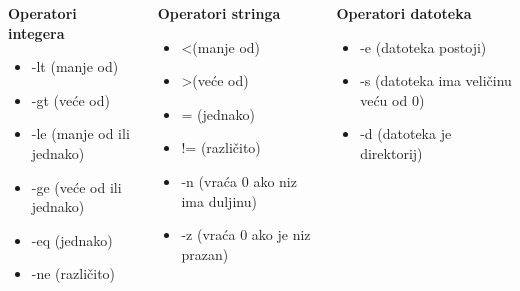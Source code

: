 \documentclass{beamer}
\begin{document}
\begin{frame}
	\begin{columns}[onlytextwidth]
		\begin{column}{0.33\textwidth}
			\centering
			\textbf{Operatori integera} \\
			\begin{itemize}
				\item -lt (manje od)
				\item -gt (veće od)
				\item -le (manje od ili jednako)
				\item -ge (veće od ili jednako)
				\item -eq (jednako)
				\item -ne (različito)
			\end{itemize}
		\end{column}
		\begin{column}{0.33\textwidth}
			\centering
			\textbf{Operatori stringa} \\
			\begin{itemize}
				\item \textless (manje od)
				\item \textgreater (veće od)
				\item = (jednako)
				\item != (različito)
				\item -n (vraća 0 ako niz ima duljinu)
				\item -z (vraća 0 ako je niz prazan)
			\end{itemize}
		\end{column}
		\begin{column}{0.33\textwidth}
			\centering
			\textbf{Operatori datoteka} \\
			\begin{itemize}
				\item -e (datoteka postoji)
				\item -s (datoteka ima veličinu veću od 0)
				\item -d (datoteka je direktorij)
			\end{itemize}
		\end{column}
	\end{columns}
\end{frame}
\end{document}
